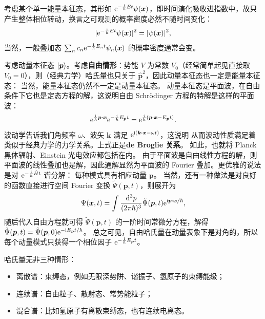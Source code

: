 考虑某个单一能量本征态，其形如 $\mathrm{e}^{-\frac{\mathrm{i}}{\hbar}E t} \psi(\bm x)$，即时间演化吸收进指数中，故只产生整体相位转动，换言之可观测的概率密度必然不随时间变化：
\[
    |\mathrm{e}^{-\frac{\mathrm{i}}{\hbar}E t} \psi(\bm x)|^2 = |\psi(\bm x)|^2,
\]
当然，一般叠加态 $\sum_n c_n \mathrm{e}^{-\frac{\mathrm{i}}{\hbar}E_n t} \psi_n(\bm x)$ 的概率密度通常会变。

考虑动量本征态 $\ket{\bm p}$。考虑\textbf{自由情形}：势能 $V$ 为常数 $V_0$（经常简单起见直接取 $V_0=0$），则（经典力学）哈氏量也只关于 $\hat{\bm p}^2$，因此动量本征态也一定是能量本征态：
当然，能量本征态仍然不一定是动量本征态。
动量本征态是平面波，在自由条件下它也是定态方程的解，这说明自由 Schrödinger 方程的特解是这样的平面波：
\[
    \e^{\frac{\i}{\hbar}\bm p\vdot\bm x}\e^{-\frac{\i}{\hbar}E_{\bm p} t} = \e^{\frac{\i}{\hbar}(\bm p\vdot\bm x - E_{\bm p} t)}.
\]
波动学告诉我们角频率 $\omega$、波矢 $\bm k$ 满足 $\e^{\i(\bm k\vdot\bm x - \omega t)}$，这说明
从而波动性质满足着类似于经典力学的力学关系。上式正是\textbf{de Broglie 关系}。
如此，也就将 Planck 黑体辐射、Einstein 光电效应都包括在内。
由于平面波是自由线性方程的解，则平面波的线性叠加也是解，因此通解显然为平面波的 Fourier 叠加。更优雅的说法是对 $\mathrm{e}^{-\frac{\mathrm{i}}{\hbar}\hat H t}$ 谱分解：
每种模式具有相应动量 $\bm p$。
当然，还有一种做法是对良好的函数直接进行空间 Fourier 变换 $\tilde\Psi(\bm p,t)$，则展开为
\[\Psi(\bm x,t) = \int\frac{\dd[3]{p}}{(2\pi\hbar)^3}\tilde\Psi(\bm p,t) \mathrm{e}^{\mathrm{i} \bm p\cdot\bm x/\hbar},\]
随后代入自由方程就可得 $\tilde\Psi(\bm p,t)$ 的一阶时间常微分方程，解得 $\tilde\Psi(\bm p,t) = \tilde\Psi(\bm p,0)\mathrm{e}^{-\mathrm{i} E_{\bm p} t/\hbar}$。
总之可见，自由哈氏量在动量表象下是对角的，所以每个动量模式只获得一个相位因子 $\mathrm{e}^{-\frac{\mathrm{i}}{\hbar}E_{\bm p} t}$。


哈氏量无非三种情形：
\begin{itemize}
    \item 离散谱：束缚态，例如无限深势阱、谐振子、氢原子的束缚能级；
    \item 连续谱：自由粒子、散射态、常势能粒子；
    \item 混合谱：比如氢原子有离散束缚态，也有连续电离态。
\end{itemize}


